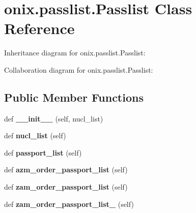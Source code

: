 \hypertarget{classonix_1_1passlist_1_1Passlist}{}\section{onix.\+passlist.\+Passlist Class Reference}
\label{classonix_1_1passlist_1_1Passlist}


Inheritance diagram for onix.\+passlist.\+Passlist\+:


Collaboration diagram for onix.\+passlist.\+Passlist\+:
\subsection*{Public Member Functions}
\begin{DoxyCompactItemize}
\item 
\mbox{\label{classonix_1_1passlist_1_1Passlist_a08ceee05f0a07eeec20a57aac4dd98a7}} 
def {\bfseries \+\_\+\+\_\+init\+\_\+\+\_\+} (self, nucl\+\_\+list)
\item 
\mbox{\label{classonix_1_1passlist_1_1Passlist_a404f0288e868a58e72a48799b6454ee2}} 
def {\bfseries nucl\+\_\+list} (self)
\item 
\mbox{\label{classonix_1_1passlist_1_1Passlist_aeb850c1bc5814c3caf7359410a2819ed}} 
def {\bfseries passport\+\_\+list} (self)
\item 
\mbox{\label{classonix_1_1passlist_1_1Passlist_a5c41ae3e7fca8faa2ea456815daf2783}} 
def {\bfseries azm\+\_\+order\+\_\+passport\+\_\+list} (self)
\item 
\mbox{\label{classonix_1_1passlist_1_1Passlist_a2ea3dca4ecc9c1183d299c8de843c7a7}} 
def {\bfseries zam\+\_\+order\+\_\+passport\+\_\+list} (self)
\item 
\mbox{\label{classonix_1_1passlist_1_1Passlist_a2ac067d62e27412c0dbaf0c6d3c3848f}} 
def {\bfseries zam\+\_\+order\+\_\+passport\+\_\+list\+\_} (self)
\item 
\mbox{\label{classonix_1_1passlist_1_1Passlist_a63eb458fc2fc81fd8c20cd8db7b312ac}} 

\end{DoxyCompactItemize}
